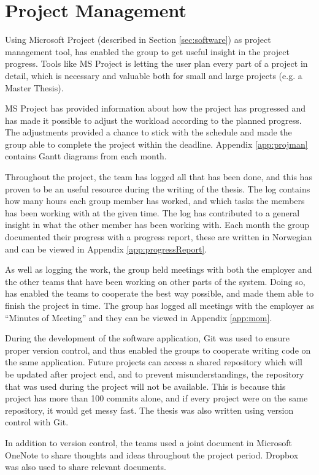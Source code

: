 \chapter{Project Management}
\label{cha:projectmanagement}
Using Microsoft Project (described in Section \ref{sec:software}) as project management tool, has enabled the group to get useful insight in the project progress. Tools like MS Project is letting the user plan every part of a project in detail, which is necessary and valuable both for small and large projects (e.g. a Master Thesis).

MS Project has provided information about how the project has progressed and has made it possible to adjust the workload according to the planned progress. The adjustments provided a chance to stick with the schedule and made the group able to complete the project within the deadline. Appendix \ref{app:projman} contains Gantt diagrams from each month.

Throughout the project, the team has logged all that has been done, and this has proven to be an useful resource during the writing of the thesis. The log contains how many hours each group member has worked, and which tasks the members has been working with at the given time. The log has contributed to a general insight in what the other member has been working with. Each month the group documented their progress with a progress report, these are written in Norwegian and can be viewed in Appendix \ref{app:progressReport}.

As well as logging the work, the group held meetings with both the employer and the other teams that have been working on other parts of the system. Doing so, has enabled the teams to cooperate the best way possible, and made them able to finish the project in time. The group has logged all meetings with the employer as ``Minutes of Meeting'' and they can be viewed in Appendix \ref{app:mom}.

During the development of the software application, Git was used to ensure proper version control, and thus enabled the groups to cooperate writing code on the same application. Future projects can access a shared repository which will be updated after project end, and to prevent misunderstandings, the repository that was used during the project will not be available. This is because this project has more than 100 commits alone, and if every project were on the same repository, it would get messy  fast. The thesis was also written using version control with Git.

In addition to version control, the teams used a joint document in Microsoft OneNote to share thoughts and ideas throughout the project period. Dropbox was also used to share relevant documents.